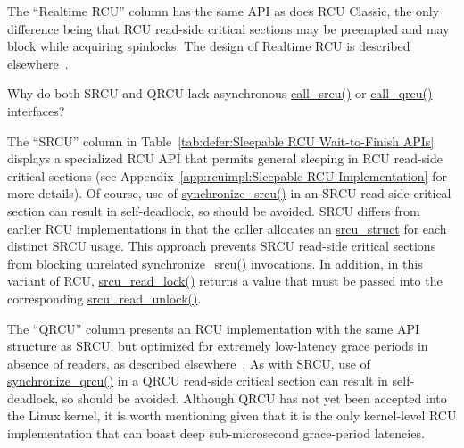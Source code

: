 The ``Realtime RCU'' column has the same API as does
RCU Classic, the only difference being that RCU read-side critical
sections may be preempted and may block while acquiring spinlocks.
The design of Realtime RCU is described
elsewhere~\cite{PaulEMcKenney2007PreemptibleRCU}.

\QuickQuiz{}
	Why do both SRCU and QRCU lack asynchronous \url{call_srcu()}
	or \url{call_qrcu()} interfaces?
 \QuickQuizEnd

The ``SRCU'' column in
Table~\ref{tab:defer:Sleepable RCU Wait-to-Finish APIs}
displays a specialized RCU API that permits
general sleeping in RCU read-side critical sections
(see Appendix~\ref{app:rcuimpl:Sleepable RCU Implementation} for more details).
Of course,
use of \url{synchronize_srcu()} in an SRCU read-side
critical section can result in
self-deadlock, so should be avoided.
SRCU differs from earlier RCU implementations in that the caller
allocates an \url{srcu_struct} for each distinct SRCU
usage.
This approach prevents SRCU read-side critical sections from blocking
unrelated \url{synchronize_srcu()} invocations.
In addition, in this variant of RCU, \url{srcu_read_lock()}
returns a value that must be passed into the corresponding
\url{srcu_read_unlock()}.

The ``QRCU'' column presents an RCU implementation with the same
API structure as SRCU, but optimized for extremely low-latency
grace periods in absence of readers, as described
elsewhere~\cite{PaulEMcKenney2007QRCUspin}.
As with SRCU, use of \url{synchronize_qrcu()} in a QRCU read-side
critical section can result in
self-deadlock, so should be avoided.
Although QRCU has not yet been accepted into the Linux kernel, it
is worth mentioning given that it is the only kernel-level
RCU implementation
that can boast deep sub-microsecond grace-period latencies.


